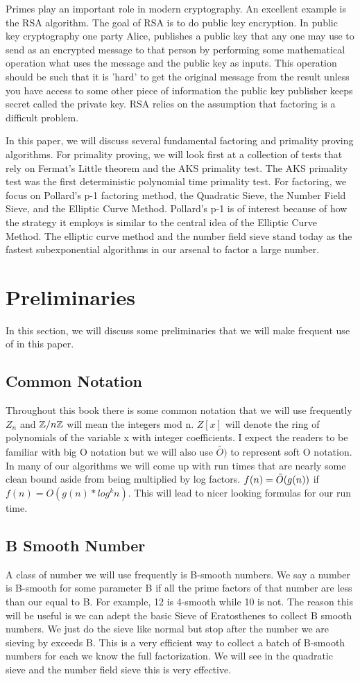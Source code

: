 \documentclass{article}
\begin{document}
Primes play an important role in modern cryptography. An excellent example is the RSA algorithm. The goal of RSA is to do public key encryption. In public key cryptography one party Alice, publishes a public key that any one may use to send as an encrypted message to that person by performing some mathematical operation what uses the message and the public key as inputs. This operation should be such that it is 'hard' to get the original message from the result unless you have access to some other piece of information the public key publisher keeps secret called the private key. RSA relies on the assumption that factoring is a difficult problem. 

In this paper, we will discuss several fundamental factoring and primality proving algorithms. For primality proving, we will look first at a collection of tests that rely on Fermat's Little theorem and the AKS primality test. The AKS primality test was the first deterministic polynomial time primality test. For factoring, we focus on Pollard's p-1 factoring method, the Quadratic Sieve, the Number Field Sieve, and the Elliptic Curve Method. Pollard's p-1 is of interest because of how the strategy it employs is similar to the central idea of the Elliptic Curve Method. The elliptic curve method and the number field sieve stand today as the fastest subexponential algorithms in our arsenal to factor a large number. 

\section{Preliminaries}
In this section, we will discuss some preliminaries that we will make frequent use of in this paper. 
\subsection{Common Notation}
Throughout this book there is some common notation that we will use frequently $Z_n$ and $\mathbb{Z} / n \mathbb{Z}$ will mean the integers mod n. $Z[x]$ will denote the ring of polynomials of the variable x with integer coefficients. I expect the readers to be familiar with big O notation but we will also use $\tilde{O)}$ to represent soft O notation. In many of our algorithms we will come up with run times that are nearly some clean bound aside from being multiplied by log factors. $f(n) = \tilde{O}(g(n))$ if $f(n) = O(g(n) * log^k n)$. This will lead to nicer looking formulas for our run time. 
\subsection{B Smooth Number}
A class of number we will use frequently is B-smooth numbers. We say a number is B-smooth for some parameter B if all the prime factors of that number are less than our equal to B. For example, 12 is 4-smooth while 10 is not. The reason this will be useful is we can adept the basic Sieve of Eratosthenes to collect B smooth numbers. We just do the sieve like normal but stop after the number we are sieving by exceeds B. This is a very efficient way to collect a batch of B-smooth numbers for each we know the full factorization. We will see in the quadratic sieve and the number field sieve this is very effective. 
\end{document}
